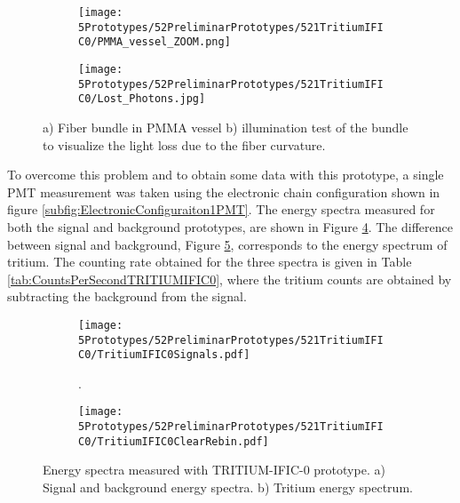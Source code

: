 \begin{figure}
\centering
    \begin{subfigure}[b]{0.45\textwidth}
    \centering
    \texttt{[image: 5Prototypes/52PreliminarPrototypes/521TritiumIFIC0/PMMA\_vessel\_ZOOM.png]}  
    \caption{\label{subfig:PMMAVesselToTestLostPhotons}}
    \end{subfigure}
    \hfill
    \begin{subfigure}[b]{0.45\textwidth}
    \centering
    \texttt{[image: 5Prototypes/52PreliminarPrototypes/521TritiumIFIC0/Lost\_Photons.jpg]}  
    \caption{\label{subfig:TestLostPhotons}}
    \end{subfigure}
 \caption{a) Fiber bundle in PMMA vessel b) illumination test of the bundle to visualize the light loss due to the fiber curvature.}
 \label{fig:TestLostPhotons}
\end{figure}

To overcome this problem and to obtain some data with this prototype, a single PMT measurement was taken using the electronic chain configuration shown in figure \ref{subfig:ElectronicConfiguraiton1PMT}. The energy spectra measured for both the signal and background prototypes, are shown in Figure \ref{subfig:SignalBackgroundEnergySpectraTritiumIFIC0}. The difference between signal and background, Figure \ref{subfig:TritiumEnergySpectraTritiumIFIC0}, corresponds to the energy spectrum of tritium. The counting rate obtained for the three spectra is given in Table \ref{tab:CountsPerSecondTRITIUMIFIC0}, where the tritium counts are obtained by subtracting the background from the signal.


\begin{figure}
\centering
    \begin{subfigure}[b]{1\textwidth}
    \centering
    \texttt{[image: 5Prototypes/52PreliminarPrototypes/521TritiumIFIC0/TritiumIFIC0Signals.pdf]}  
    \caption{.\label{subfig:SignalBackgroundEnergySpectraTritiumIFIC0}}
    \end{subfigure}
    \hfill
    \begin{subfigure}[b]{1\textwidth}
    \centering
    \texttt{[image: 5Prototypes/52PreliminarPrototypes/521TritiumIFIC0/TritiumIFIC0ClearRebin.pdf]}  
    \caption{\label{subfig:TritiumEnergySpectraTritiumIFIC0}}
    \end{subfigure}
 \caption{Energy spectra measured with TRITIUM-IFIC-0 prototype. a) Signal and background energy spectra. b) Tritium energy spectrum.}
 \label{fig:EnergySpectraTRITIUMIFIC0}
\end{figure}

